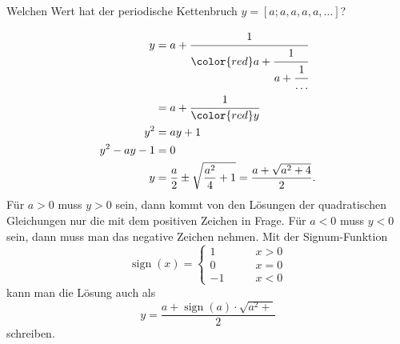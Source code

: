 Welchen Wert hat der periodische Kettenbruch 
$y=[a;a,a,a,a,\dots]$?


\begin{loesung}
\begin{align*}
y&=a+\cfrac{1}{{\color{red}a+\cfrac{1}{a+\cfrac{1}{\dots}}}}
\\
&=
a+\cfrac{1}{{\color{red}y}}
\\
y^2&=ay + 1
\\
y^2-ay-1&=0
\\
y&=\frac{a}{2}\pm\sqrt{\frac{a^2}{4}+1}
=
\frac{a+\sqrt{a^2+4}}2.
\end{align*}
Für $a>0$ muss $y>0$ sein, dann kommt von den Lösungen der quadratischen
Gleichungen nur die mit dem positiven Zeichen in Frage.
Für $a<0$ muss $y<0$ sein, dann muss man das negative Zeichen nehmen.
Mit der Signum-Funktion
\[
\operatorname{sign}(x) =
\begin{cases}
1&\qquad x> 0\\
0&\qquad x=0\\
-1&\qquad x<0
\end{cases}
\]
kann man die Lösung auch als
\[
y = \frac{a+\operatorname{sign}(a)\cdot\sqrt{a^2+}}2
\]
schreiben.
\end{loesung}
